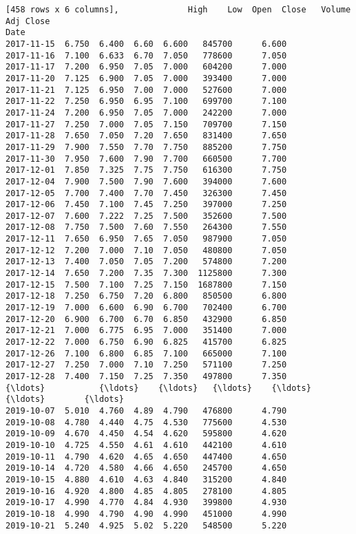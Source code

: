 \documentclass[11pt]{article}
\begin{document}
\begin{Verbatim}[commandchars=\\\{\}]
[458 rows x 6 columns],              High    Low  Open  Close   Volume  Adj Close
Date                                                     
2017-11-15  6.750  6.400  6.60  6.600   845700      6.600
2017-11-16  7.100  6.633  6.70  7.050   778600      7.050
2017-11-17  7.200  6.950  7.05  7.000   604200      7.000
2017-11-20  7.125  6.900  7.05  7.000   393400      7.000
2017-11-21  7.125  6.950  7.00  7.000   527600      7.000
2017-11-22  7.250  6.950  6.95  7.100   699700      7.100
2017-11-24  7.200  6.950  7.05  7.000   242200      7.000
2017-11-27  7.250  7.000  7.05  7.150   709700      7.150
2017-11-28  7.650  7.050  7.20  7.650   831400      7.650
2017-11-29  7.900  7.550  7.70  7.750   885200      7.750
2017-11-30  7.950  7.600  7.90  7.700   660500      7.700
2017-12-01  7.850  7.325  7.75  7.750   616300      7.750
2017-12-04  7.900  7.500  7.90  7.600   394000      7.600
2017-12-05  7.700  7.400  7.70  7.450   326300      7.450
2017-12-06  7.450  7.100  7.45  7.250   397000      7.250
2017-12-07  7.600  7.222  7.25  7.500   352600      7.500
2017-12-08  7.750  7.500  7.60  7.550   264300      7.550
2017-12-11  7.650  6.950  7.65  7.050   987900      7.050
2017-12-12  7.200  7.000  7.10  7.050   480800      7.050
2017-12-13  7.400  7.050  7.05  7.200   574800      7.200
2017-12-14  7.650  7.200  7.35  7.300  1125800      7.300
2017-12-15  7.500  7.100  7.25  7.150  1687800      7.150
2017-12-18  7.250  6.750  7.20  6.800   850500      6.800
2017-12-19  7.000  6.600  6.90  6.700   702400      6.700
2017-12-20  6.900  6.700  6.70  6.850   432900      6.850
2017-12-21  7.000  6.775  6.95  7.000   351400      7.000
2017-12-22  7.000  6.750  6.90  6.825   415700      6.825
2017-12-26  7.100  6.800  6.85  7.100   665000      7.100
2017-12-27  7.250  7.000  7.10  7.250   571100      7.250
2017-12-28  7.400  7.150  7.25  7.350   497800      7.350
{\ldots}           {\ldots}    {\ldots}   {\ldots}    {\ldots}      {\ldots}        {\ldots}
2019-10-07  5.010  4.760  4.89  4.790   476800      4.790
2019-10-08  4.780  4.440  4.75  4.530   775600      4.530
2019-10-09  4.670  4.450  4.54  4.620   595800      4.620
2019-10-10  4.725  4.550  4.61  4.610   442100      4.610
2019-10-11  4.790  4.620  4.65  4.650   447400      4.650
2019-10-14  4.720  4.580  4.66  4.650   245700      4.650
2019-10-15  4.880  4.610  4.63  4.840   315200      4.840
2019-10-16  4.920  4.800  4.85  4.805   278100      4.805
2019-10-17  4.990  4.770  4.84  4.930   399800      4.930
2019-10-18  4.990  4.790  4.90  4.990   451000      4.990
2019-10-21  5.240  4.925  5.02  5.220   548500      5.220

\end{Verbatim}
\end{document}
